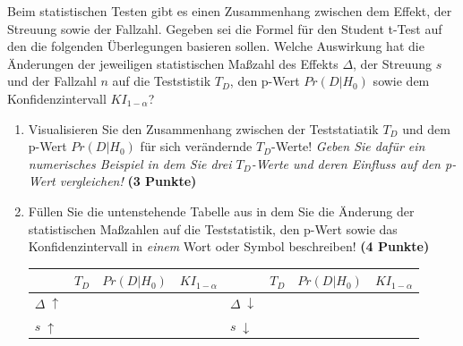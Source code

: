 \documentclass[a4paper, 9pt]{scrartcl}\usepackage[]{graphicx}\usepackage[]{xcolor}
\begin{document}
Beim statistischen Testen gibt es einen Zusammenhang zwischen dem Effekt,
der Streuung sowie der Fallzahl. Gegeben sei die Formel f{\"u}r den Student
t-Test auf den die folgenden {\"U}berlegungen basieren sollen. Welche
Auswirkung hat die {\"A}nderungen der jeweiligen statistischen Ma{\ss}zahl des
Effekts $\Delta$, der Streuung $s$ und der Fallzahl $n$ auf die Teststistik
$T_{D}$, den p-Wert $Pr(D|H_0)$ sowie dem Konfidenzintervall
$KI_{1-\alpha}$?

\begin{enumerate}
\item Visualisieren Sie den Zusammenhang zwischen der Teststatiatik
  $T_{D}$ und dem p-Wert $Pr(D|H_0)$ f{\"u}r sich ver{\"a}ndernde $T_{D}$-Werte!
  \textit{Geben Sie daf{\"u}r ein numerisches Beispiel in dem Sie drei
    $T_{D}$-Werte und deren Einfluss auf den p-Wert vergleichen!}
  \textbf{(3 Punkte)}  
\item  F{\"u}llen Sie die untenstehende Tabelle aus in dem Sie die {\"A}nderung der
  statistischen Ma{\ss}zahlen auf die Teststatistik, den p-Wert sowie das
  Konfidenzintervall in \textit{einem} Wort oder Symbol beschreiben! \textbf{(4 Punkte)}
\begin{center}
  \large
  \begin{tabular}[c]{l|c|c|c|l|c|c|c}
    & $T_{D}$ & $Pr(D|H_0)$ & $KI_{1-\alpha}$ & & $T_{D}$ & $Pr(D|H_0)$ & $KI_{1-\alpha}$\strut\\ 
    \hline
    \textbf{$\Delta\; \uparrow$} & \hspace{1.8cm} & \hspace{1.8cm}  & \hspace{1.8cm} & \textbf{
                                                          $\Delta\; \downarrow$} &
                                                                          \hspace{1.8cm} & \hspace{1.8cm}  & \hspace{1.8cm}\strut\\
    \hline
        \textbf{$s\; \uparrow$} & \hspace{1.8cm} & \hspace{1.8cm}  & \hspace{1.8cm} & \textbf{
                                                          $s\; \downarrow$} &
                                                                          \hspace{1.8cm}
                                                & \hspace{1.8cm}  & \hspace{1.8cm}\strut\\

\end{tabular}
\end{center}
\end{enumerate}
\end{document}

